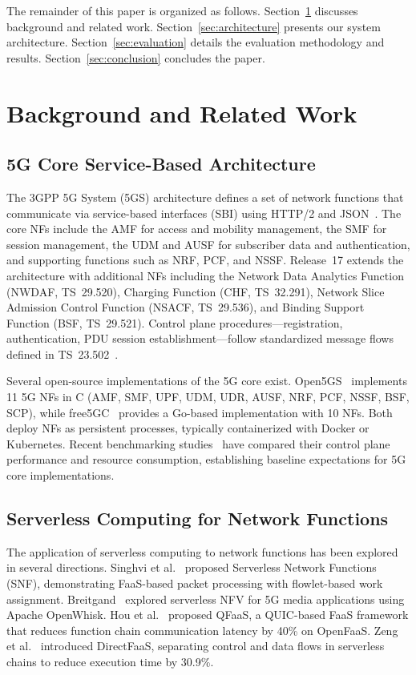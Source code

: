 \documentclass[conference]{IEEEtran}
\begin{document}
The remainder of this paper is organized as follows. Section~\ref{sec:background} discusses background and related work. Section~\ref{sec:architecture} presents our system architecture. Section~\ref{sec:evaluation} details the evaluation methodology and results. Section~\ref{sec:conclusion} concludes the paper.

\section{Background and Related Work}
\label{sec:background}

\subsection{5G Core Service-Based Architecture}

The 3GPP 5G System (5GS) architecture defines a set of network functions that communicate via service-based interfaces (SBI) using HTTP/2 and JSON~\cite{3gpp-23501}. The core NFs include the AMF for access and mobility management, the SMF for session management, the UDM and AUSF for subscriber data and authentication, and supporting functions such as NRF, PCF, and NSSF. Release~17 extends the architecture with additional NFs including the Network Data Analytics Function (NWDAF, TS~29.520), Charging Function (CHF, TS~32.291), Network Slice Admission Control Function (NSACF, TS~29.536), and Binding Support Function (BSF, TS~29.521). Control plane procedures---registration, authentication, PDU session establishment---follow standardized message flows defined in TS~23.502~\cite{3gpp-23502}.

Several open-source implementations of the 5G core exist. Open5GS~\cite{open5gs} implements 11 5G NFs in C (AMF, SMF, UPF, UDM, UDR, AUSF, NRF, PCF, NSSF, BSF, SCP), while free5GC~\cite{free5gc} provides a Go-based implementation with 10 NFs. Both deploy NFs as persistent processes, typically containerized with Docker or Kubernetes. Recent benchmarking studies~\cite{oran-bench-2024, 5gc-bench-2023} have compared their control plane performance and resource consumption, establishing baseline expectations for 5G core implementations.

\subsection{Serverless Computing for Network Functions}

The application of serverless computing to network functions has been explored in several directions. Singhvi et al.~\cite{snf-2020} proposed Serverless Network Functions (SNF), demonstrating FaaS-based packet processing with flowlet-based work assignment. Breitgand~\cite{5gmedia-2018} explored serverless NFV for 5G media applications using Apache OpenWhisk. Hou et al.~\cite{qfaas-2022} proposed QFaaS, a QUIC-based FaaS framework that reduces function chain communication latency by 40\% on OpenFaaS. Zeng et al.~\cite{directfaas-2024} introduced DirectFaaS, separating control and data flows in serverless chains to reduce execution time by 30.9\%.
\end{document}
